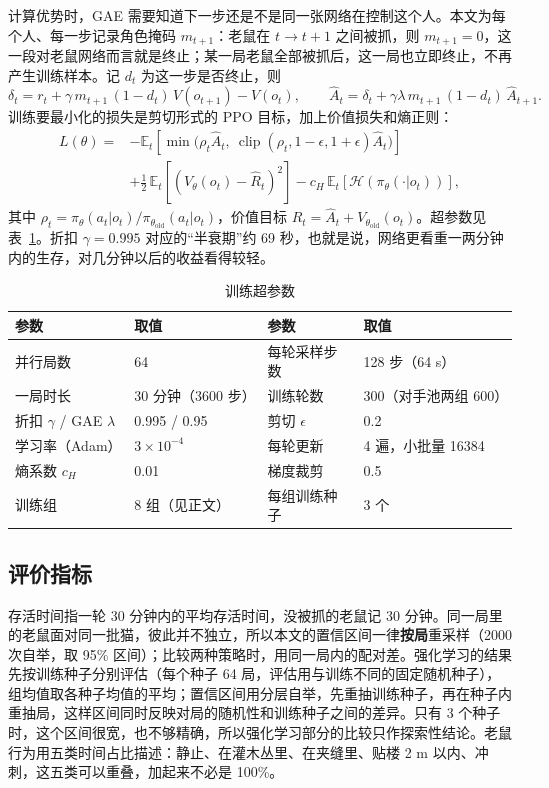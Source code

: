 计算优势时，GAE 需要知道下一步还是不是同一张网络在控制这个人。本文为每个人、每一步记录角色掩码 $m_{t+1}$：老鼠在 $t\to t+1$ 之间被抓，则 $m_{t+1}=0$，这一段对老鼠网络而言就是终止；某一局老鼠全部被抓后，这一局也立即终止，不再产生训练样本。记 $d_t$ 为这一步是否终止，则
\begin{equation}
\delta_t = r_t + \gamma\, m_{t+1}\,(1-d_t)\, V(o_{t+1}) - V(o_t),\qquad
\hat A_t = \delta_t + \gamma\lambda\, m_{t+1}\,(1-d_t)\,\hat A_{t+1}.
\end{equation}
训练要最小化的损失是剪切形式的 PPO 目标，加上价值损失和熵正则：
\begin{equation}
\begin{aligned}
L(\theta)={}&-\mathbb{E}_t\!\left[\min\!\big(\rho_t\hat A_t,\ \operatorname{clip}(\rho_t,1-\epsilon,1+\epsilon)\hat A_t\big)\right]\\
&+\tfrac12\,\mathbb{E}_t\!\left[(V_\theta(o_t)-\hat R_t)^2\right]-c_H\,\mathbb{E}_t\!\left[\mathcal H(\pi_\theta(\cdot|o_t))\right],
\end{aligned}
\end{equation}
其中 $\rho_t=\pi_\theta(a_t|o_t)/\pi_{\theta_{\text{old}}}(a_t|o_t)$，价值目标 $\hat R_t=\hat A_t+V_{\theta_{\text{old}}}(o_t)$。超参数见表~\ref{tab:hp}。折扣 $\gamma=0.995$ 对应的“半衰期”约 69 秒，也就是说，网络更看重一两分钟内的生存，对几分钟以后的收益看得较轻。

\begin{table}[htbp]
  \centering\small
  \caption{训练超参数}
  \label{tab:hp}
  \begin{tabular}{@{}ll@{\qquad}ll@{}}
    \toprule
    参数 & 取值 & 参数 & 取值\\
    \midrule
    并行局数 & 64 & 每轮采样步数 & 128 步（64 s）\\
    一局时长 & 30 分钟（3600 步） & 训练轮数 & 300（对手池两组 600）\\
    折扣 $\gamma$ / GAE $\lambda$ & 0.995 / 0.95 & 剪切 $\epsilon$ & 0.2\\
    学习率（Adam） & $3\times10^{-4}$ & 每轮更新 & 4 遍，小批量 16384\\
    熵系数 $c_H$ & 0.01 & 梯度裁剪 & 0.5\\
    训练组 & 8 组（见正文） & 每组训练种子 & 3 个\\
    \bottomrule
  \end{tabular}
\end{table}

\subsection{评价指标}
存活时间指一轮 30 分钟内的平均存活时间，没被抓的老鼠记 30 分钟。同一局里的老鼠面对同一批猫，彼此并不独立，所以本文的置信区间一律\textbf{按局}重采样（2000 次自举，取 95\% 区间）\cite{agarwal2021}；比较两种策略时，用同一局内的配对差。强化学习的结果先按训练种子分别评估（每个种子 64 局，评估用与训练不同的固定随机种子），组均值取各种子均值的平均；置信区间用分层自举，先重抽训练种子，再在种子内重抽局，这样区间同时反映对局的随机性和训练种子之间的差异。只有 3 个种子时，这个区间很宽，也不够精确，所以强化学习部分的比较只作探索性结论。老鼠行为用五类时间占比描述：静止、在灌木丛里、在夹缝里、贴楼 2 m 以内、冲刺，这五类可以重叠，加起来不必是 100\%。

